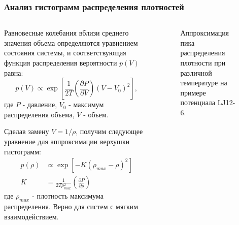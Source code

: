 \documentclass[pdf,hyperref={unicode}]{beamer}
\begin{document}
\begin{frame}
\transdissolve[duration=0.2]
\frametitle{Анализ гистограмм распределения плотностей}

\begin{columns}

\begin{column}{0.45\linewidth}
\tiny{
Равновесные колебания вблизи среднего значения объема определяются уравнением состояния системы, и соответствующая функция распределения вероятности $p(V)$ равна:
\begin{equation}
p(V) \varpropto \exp\left[ \frac{1}{2T} \left( \frac{\partial P}{\partial V} \right)  \left(V - V_0 \right)^2 \right],
\label{eqPv}
\end{equation}
где $P$ - давление, $V_0$ - максимум распределения объема, $V$ - объем.

Сделав замену $V = 1 / \rho$, получим следующее уравнение для аппроксимации верхушки гистограмм:
\begin{equation}
\begin{aligned}
p(\rho) &\varpropto \exp \left[ - K \left(\rho_{max}- \rho \right)^2 \right] \\
K &= \frac{1}{2T\rho_{max}^2} \left( \frac{\partial P}{\partial \rho} \right)
\end{aligned}
\label{eqFitRho}
\end{equation}
где $\rho_{max}$ - плотность максимума распределения. Верно для систем с мягким взаимодействием. 
}
\end{column}


\begin{column}{0.55\linewidth}

\begin{figure}[h]
\caption{\tiny Аппроксимация пика распределения плотности при различной
температуре на примере потенциала LJ12-6.}
\end{figure}


\end{column}
\end{columns}
\end{frame}
\end{document}
